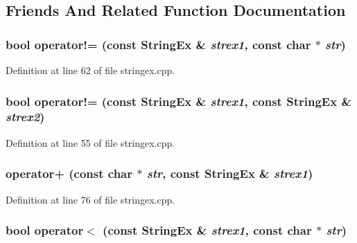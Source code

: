 \subsection{Friends And Related Function Documentation}
\hypertarget{classStringEx_5fd76bfce367d9e3f30b22169ffcb629}{
\subsubsection[{operator!=}]{\setlength{\rightskip}{0pt plus 5cm}bool operator!= (const {\bf StringEx} \& {\em strex1}, \/  const char $\ast$ {\em str})}}
\label{classStringEx_5fd76bfce367d9e3f30b22169ffcb629}




Definition at line 62 of file stringex.cpp.\hypertarget{classStringEx_be1be1e9825319fd3dc71dea82d42ad0}{
\subsubsection[{operator!=}]{\setlength{\rightskip}{0pt plus 5cm}bool operator!= (const {\bf StringEx} \& {\em strex1}, \/  const {\bf StringEx} \& {\em strex2})}}
\label{classStringEx_be1be1e9825319fd3dc71dea82d42ad0}




Definition at line 55 of file stringex.cpp.\hypertarget{classStringEx_89a13eb6dc9b0f923d3eab8b0d2dc841}{
\subsubsection[{operator+}]{ operator+ (const char $\ast$ {\em str}, \/  const {\bf StringEx} \& {\em strex1})}}
\label{classStringEx_89a13eb6dc9b0f923d3eab8b0d2dc841}




Definition at line 76 of file stringex.cpp.\hypertarget{classStringEx_193dfbca89ee16ca8cf8d70e4203487b}{
\subsubsection[{operator$<$}]{\setlength{\rightskip}{0pt plus 5cm}bool operator$<$ (const {\bf StringEx} \& {\em strex1}, \/  const char $\ast$ {\em str})}}
\label{classStringEx_193dfbca89ee16ca8cf8d70e4203487b}




